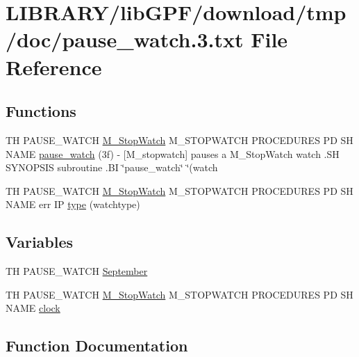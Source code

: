 \hypertarget{pause__watch_83_8txt}{}\section{L\+I\+B\+R\+A\+R\+Y/lib\+G\+P\+F/download/tmp/doc/pause\+\_\+watch.3.txt File Reference}
\label{pause__watch_83_8txt}
\subsection*{Functions}
\begin{DoxyCompactItemize}
\item 
TH P\+A\+U\+S\+E\+\_\+\+W\+A\+T\+CH \hyperlink{option__stopwatch_83_8txt_aa2011fc45a5e502e87ee50996a8a9305}{M\+\_\+\+Stop\+Watch} M\+\_\+\+S\+T\+O\+P\+W\+A\+T\+CH P\+R\+O\+C\+E\+D\+U\+R\+ES PD SH N\+A\+ME \hyperlink{pause__watch_83_8txt_a1f08bdb77c0b77a9e57928cd240ce9ea}{pause\+\_\+watch} (3f) -\/ \mbox{[}\+M\+\_\+stopwatch\mbox{]} pauses a M\+\_\+\+Stop\+Watch watch .\+S\+H S\+Y\+N\+O\+P\+S\+I\+S subroutine .\+B\+I \char`\"{}pause\+\_\+watch\char`\"{} \char`\"{}(watch
\item 
TH P\+A\+U\+S\+E\+\_\+\+W\+A\+T\+CH \hyperlink{option__stopwatch_83_8txt_aa2011fc45a5e502e87ee50996a8a9305}{M\+\_\+\+Stop\+Watch} M\+\_\+\+S\+T\+O\+P\+W\+A\+T\+CH P\+R\+O\+C\+E\+D\+U\+R\+ES PD SH N\+A\+ME err IP \hyperlink{pause__watch_83_8txt_a6d82b64df023fe3efbb7b896bcb179fa}{type} (watchtype)
\end{DoxyCompactItemize}
\subsection*{Variables}
\begin{DoxyCompactItemize}
\item 
TH P\+A\+U\+S\+E\+\_\+\+W\+A\+T\+CH \hyperlink{pause__watch_83_8txt_a9c7b5c1b7a2e7848e0da5b3d021ecba9}{September}
\item 
TH P\+A\+U\+S\+E\+\_\+\+W\+A\+T\+CH \hyperlink{option__stopwatch_83_8txt_aa2011fc45a5e502e87ee50996a8a9305}{M\+\_\+\+Stop\+Watch} M\+\_\+\+S\+T\+O\+P\+W\+A\+T\+CH P\+R\+O\+C\+E\+D\+U\+R\+ES PD SH N\+A\+ME \hyperlink{pause__watch_83_8txt_ae2a6300fc3b4629186796cf6d0c93440}{clock}
\end{DoxyCompactItemize}


\subsection{Function Documentation}
\mbox{\label{pause__watch_83_8txt_a1f08bdb77c0b77a9e57928cd240ce9ea}} 
